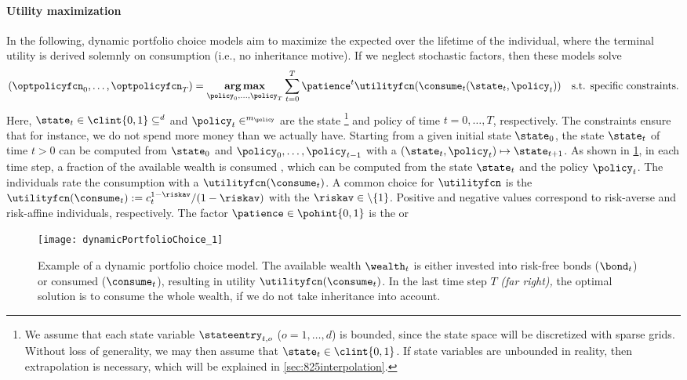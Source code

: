 \paragraph{Utility maximization}

In the following, dynamic portfolio choice models aim to maximize the expected
 over the lifetime of the individual,
where the terminal utility is derived solemnly on consumption
(i.e., no inheritance motive).
If we neglect stochastic factors, then these models solve
\begin{equation}
  \label{eq:utilityMaximization}
  (\optpolicyfcn_0, \dotsc, \optpolicyfcn_T)
  = \vecargmax_{\policy_0, \dotsc, \policy_T}
  \sum_{t=0}^T \patience^t \utilityfcn(\consume_t(\state_t, \policy_t))
  \quad\text{s.t. specific constraints.}
\end{equation}
Here, $\state_t \in \clint{\*0, \*1} \subset \real^d$ and
$\policy_t \in \real^{m_{\policy}}$
are the state%
\footnote{%
  We assume that each state variable $\stateentry_{t,o}$ ($o = 1, \dotsc, d$)
  is bounded, since the state space will be discretized with sparse grids.
  Without loss of generality, we may then assume that
  $\state_t \in \clint{\*0, \*1}$.
  If state variables are unbounded in reality, then extrapolation is necessary,
  which will be explained in \cref{sec:825interpolation}.%
}
and policy of time $t = 0, \dotsc, T$, respectively.
The constraints ensure that for instance, we do not spend more money
than we actually have.
Starting from a given initial state $\state_0$,
the state $\state_t$ of time $t > 0$ can be computed from
$\state_0$ and $\policy_0, \dotsc, \policy_{t-1}$ with a
 $(\state_t, \policy_t) \mapsto \state_{t+1}$.
As shown in \cref{fig:dynamicPortfolioChoice},
in each time step, a fraction of the available wealth is consumed
,
which can be computed from the state $\state_t$ and the policy $\policy_t$.
The individuals rate the consumption with a 
$\utilityfcn(\consume_t)$.
A common choice for $\utilityfcn$ is the 
$\utilityfcn(\consume_t) := c_t^{1-\riskav}/(1-\riskav)$
with the  $\riskav \in \real \setminus \{1\}$.
Positive and negative values correspond to risk-averse and risk-affine
individuals, respectively.
The factor $\patience \in \pohint{0, 1}$ is the 
or 

\begin{SCfigure}
  \texttt{[image: dynamicPortfolioChoice\_1]}%
  \caption[Example of a dynamic portfolio choice model]{%
    Example of a dynamic portfolio choice model.
    The available wealth $\wealth_t$ is either
    invested into risk-free bonds ($\bond_t$) or consumed ($\consume_t$),
    resulting in utility $\utilityfcn(\consume_t)$.
    In the last time step $T$ \emph{(far right),}
    the optimal solution is to consume the whole wealth,
    if we do not take inheritance into account.%
  }%
  \label{fig:dynamicPortfolioChoice}%
\end{SCfigure}

